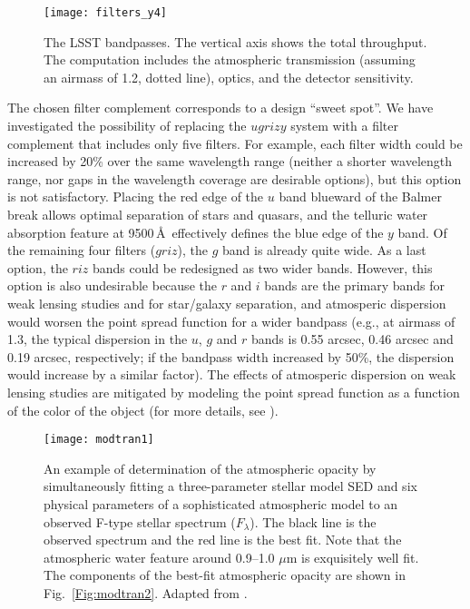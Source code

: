 \begin{figure}
\texttt{[image: filters\_y4]}
\caption{The LSST bandpasses. The vertical axis shows the total throughput. The computation
includes the atmospheric transmission (assuming an airmass of 1.2, %
dotted line), optics, and the detector sensitivity.}
\label{Fig:filters}
\end{figure}

The chosen filter complement corresponds to a design ``sweet spot''. We have
investigated the possibility of replacing the $ugrizy$ system with a
filter complement that includes only five filters. For example, each filter
width could be increased by 20\% over the same wavelength range (neither a
shorter wavelength range, nor gaps in the wavelength coverage are desirable
options), but this option is not satisfactory. Placing the red edge of the $u$
band blueward of the Balmer break allows optimal separation of stars and
quasars, and the telluric water absorption feature at 9500\,\AA\
effectively defines the blue edge of the $y$ band. Of the remaining four
filters ($griz$), the $g$ band is already quite wide. As a last option, the
$riz$ bands could be redesigned as two wider bands. However, this option is also
undesirable because the $r$ and $i$ bands are the primary bands for weak
lensing studies and for star/galaxy separation, and atmosperic dispersion
would worsen the point spread function for a wider bandpass (e.g., at airmass of
1.3, the typical dispersion in the $u$, $g$ and $r$ bands is 0.55 arcsec,
0.46 arcsec and 0.19 arcsec, respectively; if the bandpass width increased
by 50\%, the dispersion would increase by a similar factor). The effects of
atmosperic dispersion on weak lensing studies are mitigated by modeling
the point spread function as a function of the color of the object (for more
details, see \citealt{2015ApJ...807..182M, 2018MNRAS.479.1491C}).



\begin{figure}
\texttt{[image: modtran1]}
\caption{An example of determination of the atmospheric opacity by
simultaneously fitting a three-parameter stellar model SED \citep{1979ApJS...40....1K} and
six physical parameters of a sophisticated atmospheric model \citep[MODTRAN,][]{1999SPIE.3866....2A}
to an observed F-type stellar spectrum ($F_\lambda$). The black
line is the observed spectrum and the red line is the best fit. Note that the
atmospheric water feature around 0.9--1.0 $\mu$m is exquisitely well fit.
The components of the best-fit atmospheric opacity are shown in
Fig.~\ref{Fig:modtran2}. Adapted from \citet{2010ApJ...720..811B}.}
\label{Fig:modtran1}
\end{figure}

